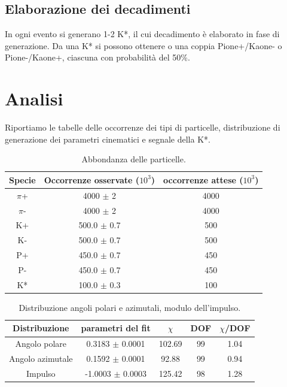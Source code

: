 \documentclass[12pt, a4paper]{article}
\begin{document}
\subsection{Elaborazione dei decadimenti}
In ogni evento si generano 1-2 K*, il cui decadimento è elaborato in fase di generazione.
Da una K* si possono ottenere o una coppia Pione+/Kaone- o Pione-/Kaone+, ciascuna con probabilità del 50\%.


\section{Analisi}
Riportiamo le tabelle delle occorrenze dei tipi di particelle, distribuzione di generazione dei parametri cinematici e segnale della K*.

\begin{table}[H]
  \begin{center}
    \caption{Abbondanza delle particelle.}
    \label{tab:table1}
    \begin{tabular}{c|c|c} %
      \textbf{Specie} & 
      \textbf{Occorrenze osservate ($10^3$)} & 
      \textbf{occorrenze attese ($10^3$)}\\
      
      \hline
      $\pi$+ & 4000 $\pm$ 2 & 4000\\
      $\pi$- & 4000 $\pm$ 2 & 4000\\
      K+ 	 & 500.0 $\pm$ 0.7 & 500\\
      K- 	 & 500.0 $\pm$ 0.7 & 500\\
      P+ 	 & 450.0 $\pm$ 0.7  & 450\\
      P- 	 & 450.0 $\pm$ 0.7 & 450\\
      K* 	 & 100.0 $\pm$ 0.3 & 100\\
     

    \end{tabular}
  \end{center}
\end{table}

\begin{table}[H]
  \begin{center}
    \caption{Distribuzione angoli polari e azimutali, modulo dell'impulso.}
    \label{tab:table2}
    \begin{tabular}{c|c|c|c|c} %
      \textbf{Distribuzione} & \textbf{parametri del fit} & \textbf{$\chi$} & \textbf{DOF} & \textbf{$\chi$/DOF}\\
      \hline
      Angolo polare & 0.3183 $\pm$ 0.0001 & 102.69 & 99 & 1.04\\
      Angolo azimutale & 0.1592 $\pm$ 0.0001 & 92.88 & 99 & 0.94 \\
      Impulso & -1.0003 $\pm$ 0.0003 & 125.42 & 98 & 1.28\\
    \end{tabular}
  \end{center}
\end{table}
\end{document}
